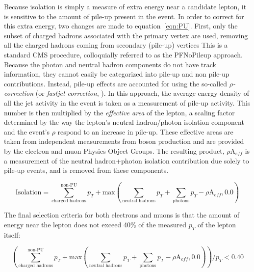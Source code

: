 Because isolation is simply a measure of extra energy near a candidate lepton,
it is sensitive to the amount of pile-up present in the event. In order to
correct for this extra energy, two changes are made to equation~\ref{eqn:PU}.
First, only the subset of charged hadrons associated with the primary vertex are
used, removing all the charged hadrons coming from secondary (pile-up) vertices
This is a standard CMS procedure, colloquially referred to as the PFNoPileup
approach. Because the photon and neutral hadron components do not have track
information, they cannot easily be categorized into pile-up and non pile-up
contributions. Instead, pile-up effects are accounted for using the so-called
\emph{$\rho$-correction} (or \emph{fastjet correction}, \cite{fastjet}). In this approach,
the average energy density of all the jet activity in the event is taken as a
measurement of pile-up activity. 
This number is then multiplied by the
\emph{effective area} of the lepton, a scaling factor determined by the way the
lepton's neutral hadron/photon isolation component and the event's $\rho$ respond to an
increase in pile-up. These effective areas are taken from independent
measurements from \Z boson production and are provided by the electron and muon
Physics Object Groups. The resulting product, $\rho \textrm{A}_{eff}$ is a
measurement of the neutral hadron+photon isolation contribution due solely to
pile-up events, and is removed from these components.

\begin{equation}
\label{eqn:PU_corr}
\textrm{Isolation} = \sum\limits_{\textrm{charged hadrons}}^{\textrm{non-PU}} p_T + \textrm{max} \left ( \sum_{\textrm{neutral
hadrons}}  p_T + \sum_{\textrm{photons}} p_T - \rho \textrm{A}_{eff}, 0.0 \right )
\end{equation}

The final selection criteria for both electrons and muons is that the amount of
energy near the lepton does not exceed 40\% of the measured $p_T$ of the lepton
itself:

\begin{equation}
\label{eqn:PU_corr}
\left ( \sum\limits_{\textrm{charged hadrons}}^{\textrm{non-PU}} p_T + \textrm{max} \left ( \sum_{\textrm{neutral
hadrons}}  p_T + \sum_{\textrm{photons}} p_T - \rho \textrm{A}_{eff}, 0.0 \right
) \right ) / p_T < 0.40
\end{equation}



